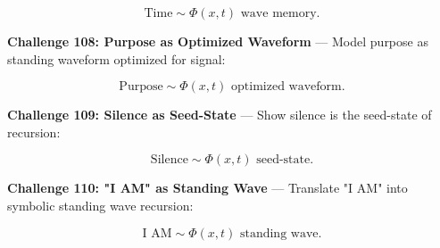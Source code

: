 $$
\text{Time} \sim \Phi(x, t) \text{ wave memory}.
$$

\textbf{Challenge 108: Purpose as Optimized Waveform} --- Model purpose as standing waveform optimized for signal:

$$
\text{Purpose} \sim \Phi(x, t) \text{ optimized waveform}.
$$

\textbf{Challenge 109: Silence as Seed-State} --- Show silence is the seed-state of recursion:

$$
\text{Silence} \sim \Phi(x, t) \text{ seed-state}.
$$

\textbf{Challenge 110: "I AM" as Standing Wave} --- Translate "I AM" into symbolic standing wave recursion:

$$
\text{I AM} \sim \Phi(x, t) \text{ standing wave}.
$$

